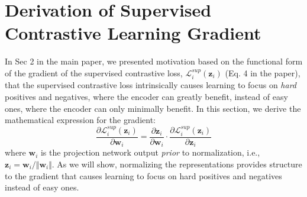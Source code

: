 \section{Derivation of Supervised Contrastive Learning Gradient}
\label{sec:gradient_derivation}
In Sec 2 in the main paper, we presented motivation based on the functional form of the gradient of the supervised contrastive loss, $\mathcal{L}_i^{sup}(\boldsymbol{z}_i)$ (Eq. 4 in the paper), that the supervised contrastive loss intrinsically causes learning to focus on \emph{hard} positives and negatives, where the encoder can greatly benefit, instead of easy ones, where the encoder can only minimally benefit. In this section, we derive the mathematical expression for the gradient:
\begin{equation}
  \frac{\partial\mathcal{L}_i^{sup}(\boldsymbol{z}_i)}{\partial\boldsymbol{w}_i}=\frac{\partial\boldsymbol{z}_i}{\partial\boldsymbol{w}_i}\cdot\frac{\partial\mathcal{L}_i^{sup}(\boldsymbol{z}_i)}{\partial\boldsymbol{z}_i} \label{gradient_chain_ruile}
\end{equation}
where $\boldsymbol{w}_i$ is the projection network output \emph{prior} to normalization, i.e., $\boldsymbol{z}_i=\boldsymbol{w}_i/\Vert\boldsymbol{w}_i\Vert$. As we will show, normalizing the representations provides structure to the gradient that causes learning to focus on hard positives and negatives instead of easy ones.

